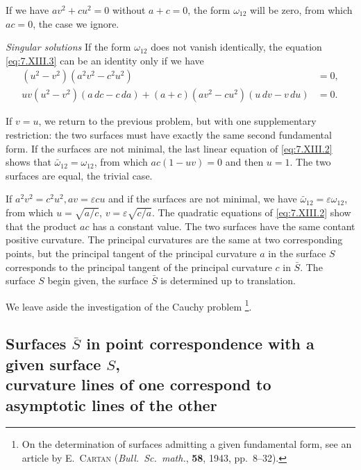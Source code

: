 \documentclass[leqno,11pt]{book}
\numberwithin{equation}{chapter}
\theoremstyle{shape1}
\theoremstyle{shape0}
\theoremstyle{shape2}
\theoremstyle{definition}
\begin{document}
If we have $av^{2}+cu^{2}=0$ without $a+c=0$, the form $\omega_{12}$ will be zero, from which $ac=0$, the case we ignore.


\vspace{12pt}\fsec\emph{Singular solutions} If the form $\omega_{12}$ does not vanish identically, the equation \eqref{eq:7.XIII.3} can be an identity only if we have
\begin{align*}
  (u^{2}-v^{2})(a^{2}v^{2}-c^{2}u^{2})&=0,\\
  uv(u^{2}-v^{2})(a\,dc-c\,da)+(a+c)(av^{2}-cu^{2})(u\,dv-v\,du)&=0.
\end{align*}

If $v=u$, we return to the previous problem, but with one supplementary restriction: the two surfaces must have exactly the same second fundamental form. If the surfaces are not minimal, the last linear equation of \eqref{eq:7.XIII.2} shows that $\bar\omega_{12}=\omega_{12}$, from which $ac(1-uv)=0$ and then $u=1$. The two surfaces are equal, the trivial case.

If $a^{2}v^{2}=c^{2}u^{2}, av=\varepsilon cu$ and if the surfaces are not minimal, we have $\bar\omega_{12}=\varepsilon\omega_{12}$, from which $u=\sqrt{a/c}$, $v=\varepsilon\sqrt{c/a}$. The quadratic equations of \eqref{eq:7.XIII.2} show that the product $ac$ has a constant value. The two surfaces have the same contant positive curvature. The principal curvatures are the same at two corresponding points, but the principal tangent of the principal curvature $a$ in the surface $S$ corresponds to the principal tangent of the principal curvature $c$ in $\bar S$. The surface $S$ begin given, the surface $\bar S$ is determined up to translation.

We leave aside the investigation of the Cauchy problem \footnote{On the determination of surfaces admitting a given fundamental form, see an article by \textsc{E.~Cartan} (\emph{Bull.~Sc.~math.}, \textbf{58}, 1943, pp.~8--32).}.



\subsection[{Surfaces $\bar S$ in point correspondence with a given surface $S$, curvature lines of one correspond to asymptotic lines of the other}]{Surfaces $\bar S$ in point correspondence with a given surface $S$,\\curvature lines of one correspond to asymptotic lines of the other}
\label{sec:surfaces-bar-s}
\end{document}
